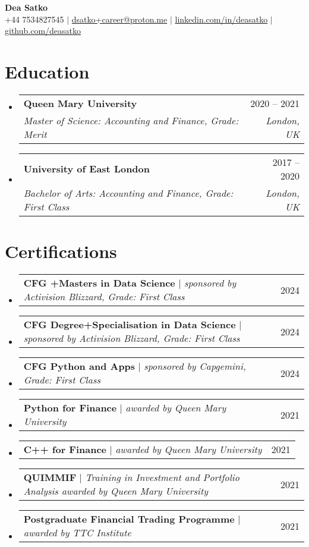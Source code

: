 \documentclass[letterpaper,11pt]{article}
\makeatletter
\newcommand{\resumeSubheading}[4]{
  \vspace{-2pt}\item
    \begin{tabular*}{0.97\textwidth}[t]{l@{\extracolsep{\fill}}r}
      \textbf{#1} & #2 \\
      \textit{\small#3} & \textit{\small #4} \\
    \end{tabular*}\vspace{-7pt}
}
\newcommand{\resumeProjectHeading}[2]{
    \item
    \begin{tabular*}{0.97\textwidth}{l@{\extracolsep{\fill}}r}
      \small#1 & #2 \\
    \end{tabular*}\vspace{-7pt}
}
\newcommand{\resumeSubHeadingListStart}{\begin{itemize}[leftmargin=0.15in, label={}]}
\newcommand{\resumeSubHeadingListEnd}{\end{itemize}}
\makeatother
\begin{document}
\begin{center}
    \textbf{\Huge Dea Satko} \\ \vspace{1pt}
    \small +44 7534827545 $|$ \href{mailto:dsatko+career@proton.me}{{dsatko+career@proton.me}} $|$ 
    \href{https://www.linkedin.com/in/deasatko/}{{linkedin.com/in/deasatko}} $|$
    \href{https://github.com/deasatko/}{{github.com/deasatko}}
\end{center}


\section{Education}
  \resumeSubHeadingListStart
    \resumeSubheading
      {Queen Mary University}{2020 -- 2021}
      {Master of Science: Accounting and Finance, Grade: Merit}{London, UK}
    \resumeSubheading
      {University of East London}{2017 -- 2020}
      {Bachelor of Arts: Accounting and Finance, Grade: First Class}{London, UK}
  \resumeSubHeadingListEnd

\section{Certifications}
  \resumeSubHeadingListStart
    \resumeProjectHeading
      {\textbf{CFG +Masters in Data Science} $|$ \emph{sponsored by Activision Blizzard, Grade: First Class}}{2024}
    \resumeProjectHeading
      {\textbf{CFG Degree+Specialisation in Data Science} $|$ \emph{sponsored by Activision Blizzard, Grade: First Class}}{2024}
    \resumeProjectHeading
      {\textbf{CFG Python and Apps} $|$ \emph{sponsored by Capgemini, Grade: First Class}}{2024}
    \resumeProjectHeading
      {\textbf{Python for Finance} $|$ \emph{awarded by Queen Mary University}}{2021}
      \resumeProjectHeading
      {\textbf{C++ for Finance} $|$ \emph{awarded by Queen Mary University}}{2021}
    \resumeProjectHeading
      {\textbf{QUIMMIF} $|$ \emph{Training in Investment and Portfolio Analysis awarded by Queen Mary University}}{2021}
    \resumeProjectHeading
      {\textbf{Postgraduate Financial Trading Programme} $|$ \emph{awarded by TTC Institute}}{2021}
\resumeSubHeadingListEnd

\end{document}
